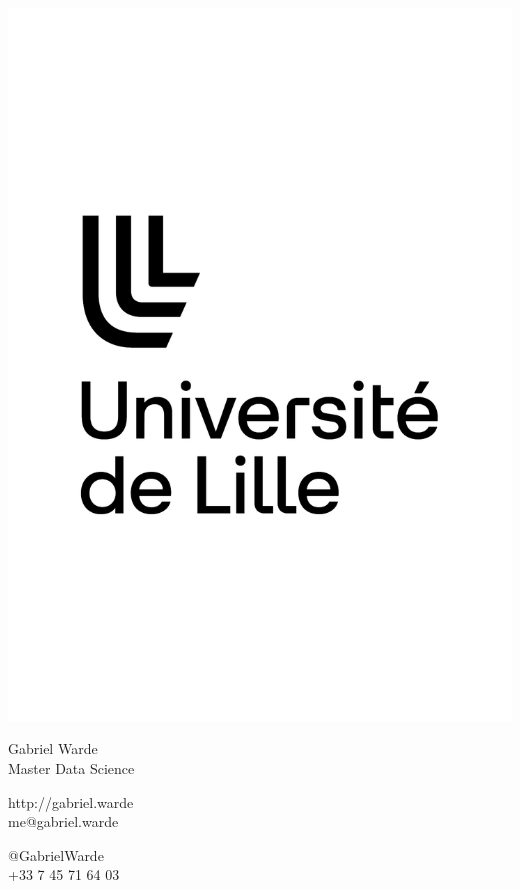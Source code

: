 \documentclass{article}
\begin{document}
\centering \includegraphics[width=.20\linewidth]{logo}\\[5pt]
\parbox{2in}{\Large \centering Gabriel Warde\\[1pt]
\normalsize Master Data Science}

\vfill
\raggedright
\begin{multicols}{2}
http://gabriel.warde\\
me@gabriel.warde

\columnbreak
\raggedleft
@GabrielWarde\\
+33 7 45 71 64 03%
\end{multicols}%
\end{document}
